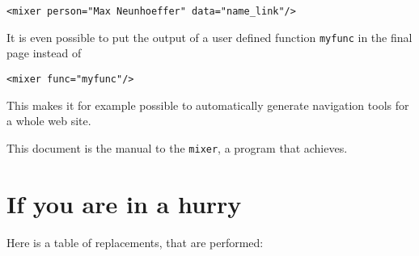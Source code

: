 \documentclass[a4paper,11pt]{article}
\newcommand{\mixer}{\texttt{mixer}}
\begin{document}
\hspace*{1cm}\verb!<mixer person="Max Neunhoeffer" data="name_link"/>!

It is even possible to put the output of a user defined function \verb!myfunc!
in the final page instead of 

\hspace*{5mm}\verb!<mixer func="myfunc"/>!

This makes it for example possible to automatically generate navigation
tools for a whole web site.

This document is the manual to the {\mixer}, a program that achieves.


\section{If you are in a hurry}
\label{hurry}

Here is a table of replacements, that are performed:
\end{document}
